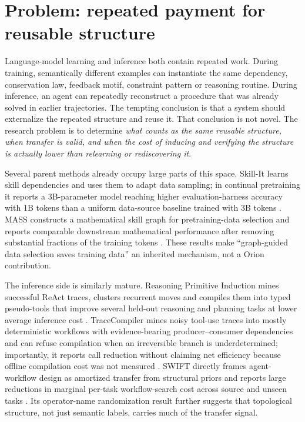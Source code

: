 \section{Problem: repeated payment for reusable structure}

Language-model learning and inference both contain repeated work. During training, semantically different examples can instantiate the same dependency, conservation law, feedback motif, constraint pattern or reasoning routine. During inference, an agent can repeatedly reconstruct a procedure that was already solved in earlier trajectories. The tempting conclusion is that a system should externalize the repeated structure and reuse it. That conclusion is not novel. The research problem is to determine \emph{what counts as the same reusable structure, when transfer is valid, and when the cost of inducing and verifying the structure is actually lower than relearning or rediscovering it}.

Several parent methods already occupy large parts of this space. Skill-It learns skill dependencies and uses them to adapt data sampling; in continual pretraining it reports a 3B-parameter model reaching higher evaluation-harness accuracy with 1B tokens than a uniform data-source baseline trained with 3B tokens \cite{chen2023skillit}. MASS constructs a mathematical skill graph for pretraining-data selection and reports comparable downstream mathematical performance after removing substantial fractions of the training tokens \cite{li2025mass}. These results make ``graph-guided data selection saves training data'' an inherited mechanism, not a Orion contribution.

The inference side is similarly mature. Reasoning Primitive Induction mines successful ReAct traces, clusters recurrent moves and compiles them into typed pseudo-tools that improve several held-out reasoning and planning tasks at lower average inference cost \cite{lei2026primitives}. TraceCompiler mines noisy tool-use traces into mostly deterministic workflows with evidence-bearing producer--consumer dependencies and can refuse compilation when an irreversible branch is underdetermined; importantly, it reports call reduction without claiming net efficiency because offline compilation cost was not measured \cite{elyadouni2026tracecompiler}. SWIFT directly frames agent-workflow design as amortized transfer from structural priors and reports large reductions in marginal per-task workflow-search cost across source and unseen tasks \cite{du2026swift}. Its operator-name randomization result further suggests that topological structure, not just semantic labels, carries much of the transfer signal.

